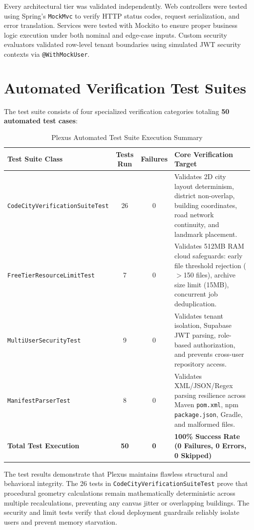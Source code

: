 \documentclass[11pt,a4paper,openany]{report}
\begin{document}
Every architectural tier was validated independently. Web controllers were tested using Spring's \texttt{MockMvc} to verify HTTP status codes, request serialization, and error translation. Services were tested with Mockito to ensure proper business logic execution under both nominal and edge-case inputs. Custom security evaluators validated row-level tenant boundaries using simulated JWT security contexts via \texttt{@WithMockUser}.

\section{Automated Verification Test Suites}
The test suite consists of four specialized verification categories totaling \textbf{50 automated test cases}:

\begin{table}[htbp]
\centering
\small
\begin{tabularx}{\textwidth}{l c c X}
\toprule
\textbf{Test Suite Class} & \textbf{Tests Run} & \textbf{Failures} & \textbf{Core Verification Target} \\
\midrule
\texttt{CodeCityVerificationSuiteTest} & 26 & 0 & Validates 2D city layout determinism, district non-overlap, building coordinates, road network continuity, and landmark placement. \\
\texttt{FreeTierResourceLimitTest} & 7 & 0 & Validates 512MB RAM cloud safeguards: early file threshold rejection ($>$150 files), archive size limit (15MB), concurrent job deduplication. \\
\texttt{MultiUserSecurityTest} & 9 & 0 & Validates tenant isolation, Supabase JWT parsing, role-based authorization, and prevents cross-user repository access. \\
\texttt{ManifestParserTest} & 8 & 0 & Validates XML/JSON/Regex parsing resilience across Maven \texttt{pom.xml}, npm \texttt{package.json}, Gradle, and malformed files. \\
\midrule
\textbf{Total Test Execution} & \textbf{50} & \textbf{0} & \textbf{100\% Success Rate (0 Failures, 0 Errors, 0 Skipped)} \\
\bottomrule
\end{tabularx}
\caption{Plexus Automated Test Suite Execution Summary}
\label{tab:test-summary}
\end{table}

The test results demonstrate that Plexus maintains flawless structural and behavioral integrity. The 26 tests in \texttt{CodeCityVerificationSuiteTest} prove that procedural geometry calculations remain mathematically deterministic across multiple recalculations, preventing any canvas jitter or overlapping buildings. The security and limit tests verify that cloud deployment guardrails reliably isolate users and prevent memory starvation.
\end{document}
